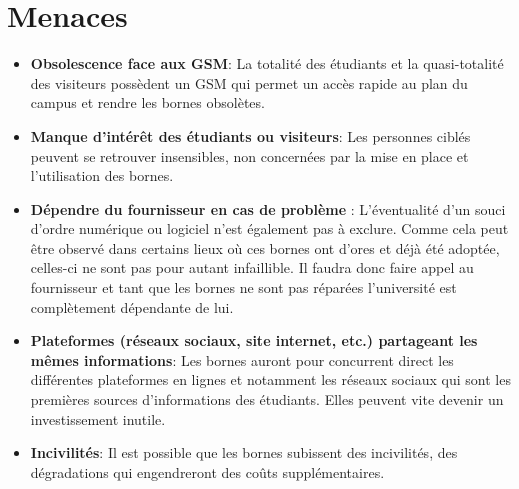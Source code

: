 \section{Menaces}
\begin{itemize}
    \item \textbf{Obsolescence face aux GSM}: La totalité des étudiants et la quasi-totalité des visiteurs possèdent un GSM qui permet un accès rapide au plan du campus et rendre les bornes obsolètes.
    \item \textbf{Manque d’intérêt des étudiants ou visiteurs}: Les personnes ciblés peuvent se retrouver insensibles, non concernées par la mise en place et l’utilisation des bornes.
    \item \textbf{Dépendre du fournisseur en cas de problème} : L’éventualité d’un souci d’ordre numérique ou logiciel n’est également pas à exclure. Comme cela peut être observé dans certains lieux où ces bornes ont d’ores et déjà été adoptée, celles-ci ne sont pas pour autant infaillible. Il faudra donc faire appel au fournisseur et tant que les bornes ne sont pas réparées l’université est complètement dépendante de lui. 
    \item \textbf{Plateformes (réseaux sociaux, site internet, etc.) partageant les mêmes informations}: Les bornes auront pour concurrent direct les différentes plateformes en lignes et notamment les réseaux sociaux qui sont les premières sources d’informations des étudiants. Elles peuvent vite devenir un investissement inutile. 
    \item \textbf{Incivilités}: Il est possible que les bornes subissent des incivilités, des dégradations qui engendreront des coûts supplémentaires. 
\end{itemize}

 


 

 








 